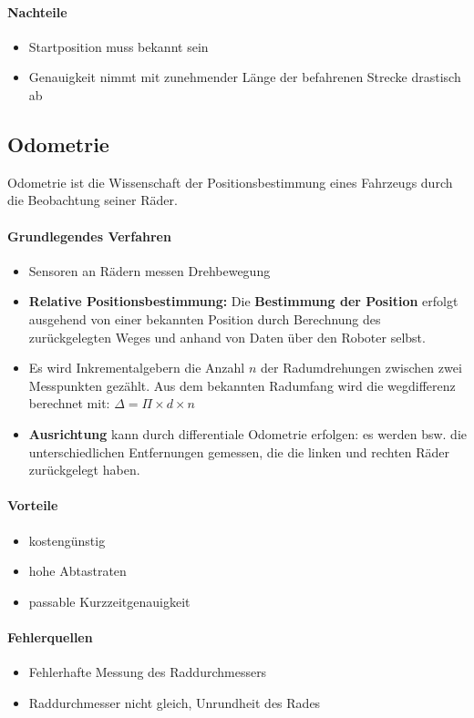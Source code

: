 \paragraph{Nachteile}
\begin{itemize}
	\item Startposition muss bekannt sein
	\item Genauigkeit nimmt mit zunehmender Länge der befahrenen Strecke
		drastisch ab
\end{itemize}

\subsection{Odometrie}
Odometrie ist die Wissenschaft der Positionsbestimmung eines Fahrzeugs durch
die Beobachtung seiner Räder.

\paragraph{Grundlegendes Verfahren}
\begin{itemize}
	\item Sensoren an Rädern messen Drehbewegung
	\item \textbf{Relative Positionsbestimmung:} Die \textbf{Bestimmung der
		Position} erfolgt ausgehend von einer bekannten Position durch Berechnung
		des zurückgelegten Weges und anhand von Daten über den Roboter selbst.
	\item Es wird Inkrementalgebern die Anzahl $n$ der Radumdrehungen zwischen
		zwei Messpunkten gezählt. Aus dem bekannten Radumfang wird die
		wegdifferenz berechnet mit:
		\subitem $\Delta = \Pi \times d \times n $
	\item \textbf{Ausrichtung} kann durch differentiale Odometrie erfolgen: es
		werden bsw. die unterschied\-lichen Entfernungen gemessen, die die linken
		und rechten Räder zurückgelegt haben.
\end{itemize}

\paragraph{Vorteile}
\begin{itemize}
	\item kostengünstig
	\item hohe Abtastraten
	\item passable Kurzzeitgenauigkeit
\end{itemize}

\paragraph{Fehlerquellen}
\begin{itemize}
	\item Fehlerhafte Messung des Raddurchmessers
	\item Raddurchmesser nicht gleich, Unrundheit des Rades
\end{itemize}

